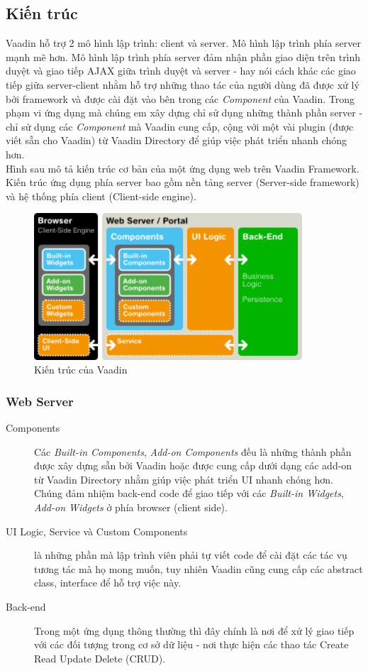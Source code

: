 \subsection{Kiến trúc}
Vaadin hỗ trợ 2 mô hình lập trình: client và server. Mô hình lập trình phía server mạnh mẽ hơn. Mô hình lập trình phía server đảm nhận phần giao diện trên trình duyệt và giao tiếp AJAX giữa trình duyệt và server - hay nói cách khác các giao tiếp giữa server-client nhằm hỗ trợ những thao tác của người dùng đã được xử lý bởi framework và được cài đặt vào bên trong các \textit{Component} của Vaadin. Trong phạm vi ứng dụng mà chúng em xây dựng chỉ sử dụng những thành phần server - chỉ sử dụng các \textit{Component} mà Vaadin cung cấp, cộng với một vài plugin (được viết sẵn cho Vaadin) từ Vaadin Directory \cite{vaadindirectory} để giúp việc phát triển nhanh chóng hơn. 
\\
Hình sau mô tả kiến trúc cơ bản của một ứng dụng web trên Vaadin Framework. Kiến trúc ứng dụng phía server bao gồm nền tảng server (Server-side framework) và hệ thống phía client (Client-side engine). 
\begin{figure}[ht!]
	\centering
	\includegraphics[width=100mm]{Figures/vaadin_architecture0.png}
	\caption{Kiến trúc của Vaadin\label{overflow}}
\end{figure}

\subsubsection{Web Server}
\begin{description}
\item[Components] Các \textit{Built-in Components}, \textit{Add-on Components} đều là những thành phần được xây dựng sẵn bởi Vaadin hoặc được cung cấp dưới dạng các add-on từ Vaadin Directory \cite{vaadindirectory} nhằm giúp việc phát triển UI nhanh chóng hơn. Chúng đảm nhiệm back-end code để giao tiếp với các \textit{Built-in Widgets}, \textit{Add-on Widgets} ở phía browser (client side).
\item[UI Logic, Service và Custom Components] là những phần mà lập trình viên phải tự viết code để cài đặt các tác vụ tương tác mà họ mong muốn, tuy nhiên Vaadin cũng cung cấp các abstract class, interface để hỗ trợ việc này. 
\item[Back-end] Trong một ứng dụng thông thường thì đây chính là nơi để xử lý giao tiếp với các đối tượng trong cơ sở dữ liệu - nơi thực hiện các thao tác Create Read Update Delete (CRUD).
\end{description}
